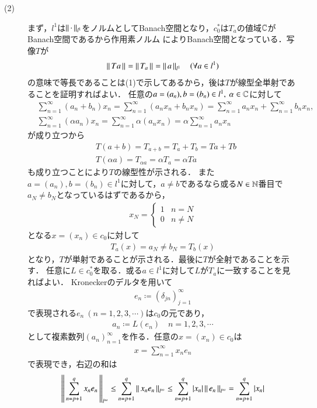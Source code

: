 \begin{prf}
\begin{description}
	\item[(2)] まず，$l^1$は$\left\|\, \cdot\, \right\|_{l^1}$をノルムとしてBanach空間となり，$c_0^*$は$T_a$の値域$\mathbb{C}$がBanach空間であるから作用素ノルム
		によりBanach空間となっている．写像$T$が
		\begin{align}
			\left\|\, Ta\, \right\|_{} = \left\|\, T_a\, \right\|_{} = \left\|\, a\, \right\|_{l^1}\quad (\forall a \in l^1)
		\end{align}
		の意味で等長であることは(1)で示してあるから，後は$T$が線型全単射であることを証明すればよい．
		任意の$a = (a_n), b=(b_n) \in l^1,\ \alpha \in \mathbb{C}$に対して
		\begin{align}
			&\sum_{n=1}^{\infty} (a_n + b_n) x_n 
			= \sum_{n=1}^{\infty} (a_n x_n + b_n x_n) 
			=  \sum_{n=1}^{\infty} a_n x_n + \sum_{n=1}^{\infty} b_n x_n, \\
			&\sum_{n=1}^{\infty} (\alpha a_n) x_n
			= \sum_{n=1}^{\infty} \alpha (a_n x_n)
			= \alpha \sum_{n=1}^{\infty} a_n x_n
		\end{align}
		が成り立つから
		\begin{align}
			&T(a+b) = T_{a+b} = T_a + T_b = Ta + Tb \\
			&T(\alpha a) = T_{\alpha a} = \alpha T_a = \alpha Ta
		\end{align}
		も成り立つことにより$T$の線型性が示される．
		また$a = (a_n), b=(b_n) \in l^1$に対して，$a \neq b$であるなら或る$N \in \mathbb{N}$番目で
		$a_N \neq b_N$となっているはずであるから，
		\begin{align}
			x_N = \begin{cases}
				1 & n=N \\
				0 & n \neq N
			\end{cases}
		\end{align}
		となる$x=(x_n) \in c_0$に対して
		\begin{align}
			T_a(x) = a_N \neq b_N = T_b(x)
		\end{align}
		となり，$T$が単射であることが示される．最後に$T$が全射であることを示す．
		任意に$L \in c_0^*$を取る．或る$a \in l^1$に対して$L$が$T_a$に一致することを見ればよい．
		Kroneckerのデルタを用いて
		\begin{align}
			e_n \coloneqq (\delta_{jn})_{j=1}^{\infty}
		\end{align}
		で表現される$e_n\ (n=1,2,3,\cdots)$は$c_0$の元であり，
		\begin{align}
			a_n \coloneqq L(e_n)\quad n=1,2,3,\cdots
		\end{align}
		として複素数列$(a_n)_{n=1}^{\infty}$を作る．任意の$x=(x_n) \in c_0$は
		\begin{align}
			x = \sum_{n=1}^{\infty} x_n e_n
		\end{align}
		で表現でき，右辺の和は
		\begin{align}
			\left\|\, \sum_{n=p+1}^{q} x_n e_n\, \right\|_{l^{\infty}} 
			\leq \sum_{n=p+1}^{q} \left\|\, x_n e_n\, \right\|_{l^{\infty}} 
			\leq \sum_{n=p+1}^{q} |x_n| \left\|\, e_n\, \right\|_{l^{\infty}}
			= \sum_{n=p+1}^{q} |x_n|
		\end{align}
\end{description}
\end{prf}